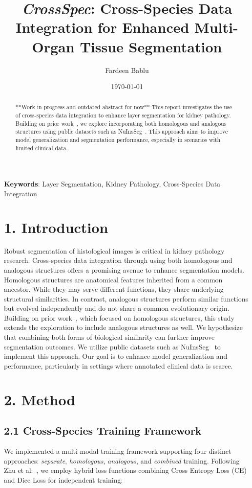 \documentclass[11pt]{article}
\title{\bfseries\Large \textit{CrossSpec}: Cross-Species Data Integration for Enhanced Multi-Organ Tissue Segmentation
}
\author[1]{Fardeen Bablu}
\affil[1]{Department of Computer Science, Vanderbilt University, Nashville, TN, USA \\ \texttt{fardeen.e.bablu@vanderbilt.edu}}
\date{\today}
\begin{document}
\maketitle

\begin{abstract}
\noindent
**Work in progress and outdated abstract for now**
This report investigates the use of cross-species data integration to enhance layer segmentation for kidney pathology. Building on prior work~\cite{zhu2025crossspeciesdataintegrationenhanced}, we explore incorporating both homologous and analogous structures using public datasets such as NuInsSeg~\cite{Mahbod2024}. This approach aims to improve model generalization and segmentation performance, especially in scenarios with limited clinical data.
\end{abstract}

\textbf{Keywords}: Layer Segmentation, Kidney Pathology, Cross-Species Data Integration

\section*{1. Introduction}
\noindent
Robust segmentation of histological images is critical in kidney pathology research. Cross-species data integration through using both homologous and analogous structures offers a promising avenue to enhance segmentation models. Homologous structures are anatomical features inherited from a common ancestor. While they may serve different functions, they share underlying structural similarities. In contrast, analogous structures perform similar functions but evolved independently and do not share a common evolutionary origin. Building on prior work~\cite{zhu2025crossspeciesdataintegrationenhanced}, which focused on homologous structures, this study extends the exploration to include analogous structures as well. We hypothesize that combining both forms of biological similarity can further improve segmentation outcomes. We utilize public datasets such as NuInsSeg~\cite{Mahbod2024} to implement this approach. Our goal is to enhance model generalization and performance, particularly in settings where annotated clinical data is scarce.

\section*{2. Method}

\subsection*{2.1 Cross-Species Training Framework}
\noindent
We implemented a multi-modal training framework supporting four distinct approaches: \textit{separate}, \textit{homologous}, \textit{analogous}, and \textit{combined} training. Following Zhu et al.~\cite{zhu2025crossspeciesdataintegrationenhanced}, we employ hybrid loss functions combining Cross Entropy Loss (CE) and Dice Loss for independent training:
\end{document}
